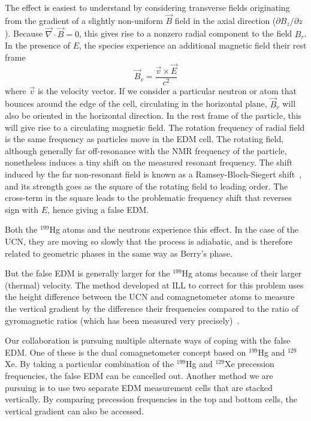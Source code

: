 The effect is easiest to understand by considering transverse fields
originating from the gradient of a slightly non-uniform $\vec{B}$
field in the axial direction ($\partial B_z/\partial z$).  Because
$\vec{\nabla}\cdot\vec{B}=0$, this gives rise to a nonzero radial
component to the field $B_r$.  In the presence of $E$, the species
experience an additional magnetic field their rest frame
\begin{equation}
  \vec{B}_v=\frac{\vec{v}\times\vec{E}}{c^2}
  \label{equation:phase effect}
\end{equation}
where $\vec{v}$ is the velocity vector.  If we consider a particular
neutron or atom that bounces around the edge of the cell, circulating
in the horizontal plane, $\vec{B}_v$ will also be oriented in the
horizontal direction.  In the rest frame of the particle, this will
give rise to a circulating magnetic field.  The rotation frequency of
radial field is the same frequency as particles move in the EDM cell.
The rotating field, although generally far off-resonance with the NMR
frequency of the particle, nonetheless induces a tiny shift on the
measured resonant frequency.  The shift induced by the far
non-resonant field is known as a Ramsey-Bloch-Siegert
shift~\cite{bib:ramsey,bib:bloch-siegert}, and its strength goes as
the square of the rotating field to leading order.  The cross-term in
the square leads to the problematic frequency shift that reverses sign
with $E$, hence giving a false EDM.

Both the $^{199}$Hg atoms and the neutrons experience this effect.  In
the case of the UCN, they are moving so slowly that the process is
adiabatic, and is therefore related to geometric phases in the same
way as Berry's phase.

But the false EDM is generally larger for the $^{199}$Hg atoms because
of their larger (thermal) velocity.  The method developed at ILL to
correct for this problem uses the height difference between the UCN
and comagnetometer atoms to measure the vertical gradient by the
difference their frequencies compared to the ratio of gyromagnetic
ratios (which has been measured very precisely)~\cite{bib:baker}.

Our collaboration is pursuing multiple alternate ways of coping with
the false EDM.  One of these is the dual comagnetometer concept based
on $^{199}$Hg and $^{129}$Xe.  By taking a particular combination of
the $^{199}$Hg and $^{129}$Xe precession frequencies, the false EDM
can be cancelled out.  Another method we are pursuing is to use two
separate EDM measurement cells that are stacked vertically.  By
comparing precession frequencies in the top and bottom cells, the
vertical gradient can also be accessed.

